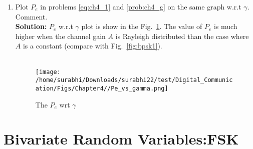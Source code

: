\documentclass[journal,10pt,twocolumn]{IEEEtran}
\newcounter{Chapcounter}
\numberwithin{equation}{subsection}
\numberwithin{figure}{subsection}
\renewcommand\thesection{\theChapcounter.\arabic{section}}
\newcommand\figref{Fig.~\ref}
\newcommand{\solution}{\noindent \textbf{Solution: }}
\renewcommand\thesection{\arabic{section}}
\renewcommand\thesubsection{\thesection.\arabic{subsection}}
\begin{document}
\begin{enumerate}[label=\thesubsection.\arabic*,ref=\thesubsection.\arabic{figure}]
\item
Plot $P_e$ in problems \ref{eq:ch4_1} and \ref{prob:ch4_g} on the same graph w.r.t $\gamma$.  Comment. \\
\solution $P_e$ w.r.t $\gamma$ plot is show in the \figref{fig:Pe_gamma1}. The value of $P_e$ is much higher when the channel %
gain $A$ is Rayleigh distributed than the case where $A$ is a constant (compare with \figref{fig:bpsk1}).\\


\\	

\begin{figure}[!ht]
\centering
\texttt{[image: /home/surabhi/Downloads/surabhi22/test/Digital\_Communication/Figs/Chapter4//Pe\_vs\_gamma.png]}      
\caption{The $P_e$ wrt $\gamma$ }
\label{fig:Pe_gamma1}
\end{figure}

\end{enumerate}

\section{Bivariate Random Variables:FSK}
\end{document}
